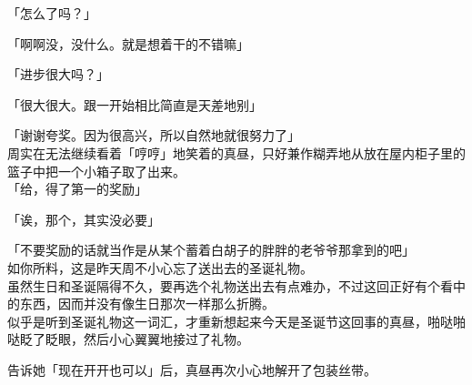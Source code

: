 「怎么了吗？」

「啊啊没，没什么。就是想着干的不错嘛」

「进步很大吗？」

「很大很大。跟一开始相比简直是天差地别」

「谢谢夸奖。因为很高兴，所以自然地就很努力了」\\

周实在无法继续看着「哼哼」地笑着的真昼，只好兼作糊弄地从放在屋内柜子里的篮子中把一个小箱子取了出来。\\

「给，得了第一的奖励」

「诶，那个，其实没必要」

「不要奖励的话就当作是从某个蓄着白胡子的胖胖的老爷爷那拿到的吧」\\

如你所料，这是昨天周不小心忘了送出去的圣诞礼物。\\

虽然生日和圣诞隔得不久，要再选个礼物送出去有点难办，不过这回正好有个看中的东西，因而并没有像生日那次一样那么折腾。\\

似乎是听到圣诞礼物这一词汇，才重新想起来今天是圣诞节这回事的真昼，啪哒啪哒眨了眨眼，然后小心翼翼地接过了礼物。

告诉她「现在开开也可以」后，真昼再次小心地解开了包装丝带。\\

